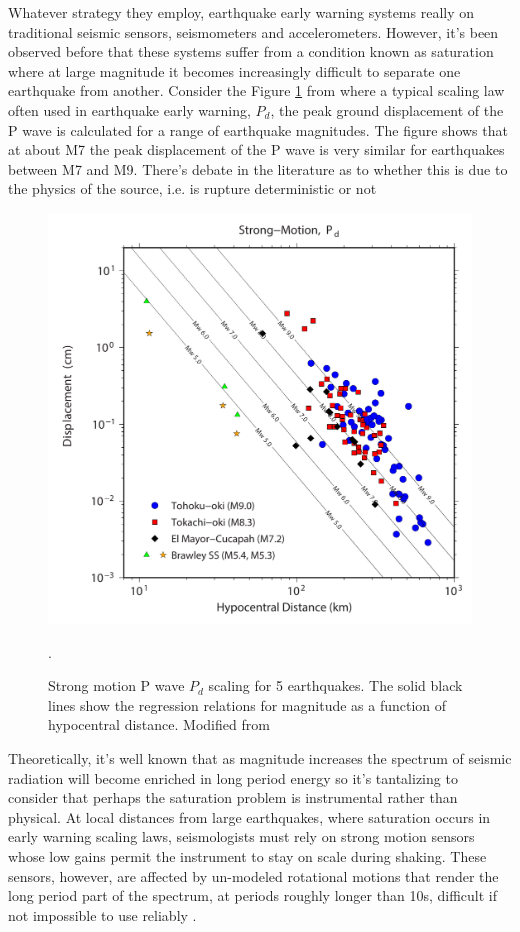 Whatever strategy they employ, earthquake early warning systems really on traditional seismic sensors, seismometers and accelerometers. However, it's been observed before that these systems suffer from a condition known as saturation \citep{Brown2011} where at large magnitude it becomes increasingly difficult to separate one earthquake from another. Consider the Figure \ref{fig_pd_scaling} from \citet{Crowell2013} where a typical scaling law often used in earthquake early warning, $P_d$, the peak ground displacement of the P wave \citep{wu2007_Pd} is calculated for a range of earthquake magnitudes. The figure shows that at about M7 the peak displacement of the P wave is very similar for earthquakes between M7 and M9. There's debate in the literature as to whether this is due to the physics of the source, i.e. is rupture deterministic or not \citep{olson2005}

\begin{figure}[!ht] 
  \centering
  \includegraphics[width=0.99\linewidth]{./figures/ch1/pd_scaling.pdf}
    \caption[Strong motion $P_d$ scaling]{Strong motion P wave $P_d$ scaling for 5 earthquakes. The solid black lines show the regression relations for magnitude as a function of hypocentral distance. Modified from \citep{Crowell2013}}.
  \label{fig_pd_scaling}
\end{figure}

Theoretically, it's well known that as magnitude increases the spectrum of seismic radiation will become enriched in long period energy \citep{haskell1964total,brune1970} so it's tantalizing to consider that perhaps the saturation problem is instrumental rather than physical. At local distances from large earthquakes, where saturation occurs in early warning scaling laws, seismologists must rely on strong motion sensors whose low gains permit the instrument to stay on scale during shaking. These sensors, however, are affected by un-modeled rotational motions \citep{Trifunac2001} that render the long period part of the spectrum, at periods roughly longer than 10s, difficult if not impossible to use reliably \citep{Boore2005}.

